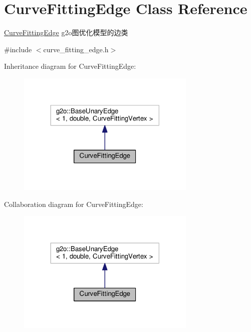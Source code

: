 \hypertarget{classCurveFittingEdge}{}\section{Curve\+Fitting\+Edge Class Reference}
\label{classCurveFittingEdge}


\hyperlink{classCurveFittingEdge}{Curve\+Fitting\+Edge} g2o图优化模型的边类  




{\ttfamily \#include $<$curve\+\_\+fitting\+\_\+edge.\+h$>$}



Inheritance diagram for Curve\+Fitting\+Edge\+:\nopagebreak
\begin{figure}[H]
\begin{center}
\leavevmode
\includegraphics[width=242pt]{classCurveFittingEdge__inherit__graph}
\end{center}
\end{figure}


Collaboration diagram for Curve\+Fitting\+Edge\+:\nopagebreak
\begin{figure}[H]
\begin{center}
\leavevmode
\includegraphics[width=242pt]{classCurveFittingEdge__coll__graph}
\end{center}
\end{figure}
